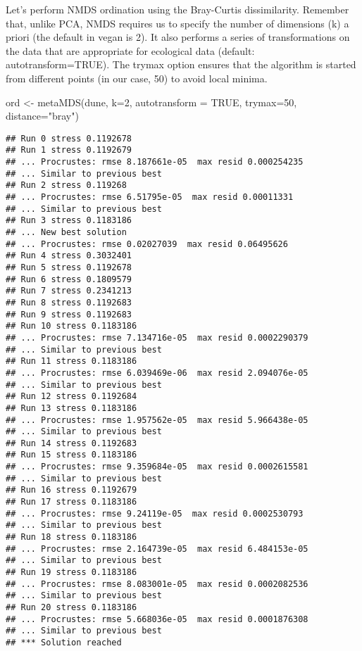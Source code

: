 \documentclass[
]{book}
\newenvironment{Shaded}{\begin{snugshade}}{\end{snugshade}}
\newcommand{\AttributeTok}[1]{\textcolor[rgb]{0.77,0.63,0.00}{#1}}
\newcommand{\ConstantTok}[1]{\textcolor[rgb]{0.00,0.00,0.00}{#1}}
\newcommand{\DecValTok}[1]{\textcolor[rgb]{0.00,0.00,0.81}{#1}}
\newcommand{\FunctionTok}[1]{\textcolor[rgb]{0.00,0.00,0.00}{#1}}
\newcommand{\NormalTok}[1]{#1}
\newcommand{\OtherTok}[1]{\textcolor[rgb]{0.56,0.35,0.01}{#1}}
\newcommand{\StringTok}[1]{\textcolor[rgb]{0.31,0.60,0.02}{#1}}
\begin{document}
Let's perform NMDS ordination using the Bray-Curtis dissimilarity. Remember that, unlike PCA, NMDS requires us to specify the number of dimensions (k) a priori (the default in vegan is 2). It also performs a series of transformations on the data that are appropriate for ecological data (default: autotransform=TRUE). The trymax option ensures that the algorithm is started from different points (in our case, 50) to avoid local minima.

\begin{Shaded}
\begin{Highlighting}[]
\NormalTok{ord }\OtherTok{\textless{}{-}} \FunctionTok{metaMDS}\NormalTok{(dune, }\AttributeTok{k=}\DecValTok{2}\NormalTok{, }\AttributeTok{autotransform =} \ConstantTok{TRUE}\NormalTok{, }\AttributeTok{trymax=}\DecValTok{50}\NormalTok{, }\AttributeTok{distance=}\StringTok{"bray"}\NormalTok{)}
\end{Highlighting}
\end{Shaded}

\begin{verbatim}
## Run 0 stress 0.1192678 
## Run 1 stress 0.1192679 
## ... Procrustes: rmse 8.187661e-05  max resid 0.000254235 
## ... Similar to previous best
## Run 2 stress 0.119268 
## ... Procrustes: rmse 6.51795e-05  max resid 0.00011331 
## ... Similar to previous best
## Run 3 stress 0.1183186 
## ... New best solution
## ... Procrustes: rmse 0.02027039  max resid 0.06495626 
## Run 4 stress 0.3032401 
## Run 5 stress 0.1192678 
## Run 6 stress 0.1809579 
## Run 7 stress 0.2341213 
## Run 8 stress 0.1192683 
## Run 9 stress 0.1192683 
## Run 10 stress 0.1183186 
## ... Procrustes: rmse 7.134716e-05  max resid 0.0002290379 
## ... Similar to previous best
## Run 11 stress 0.1183186 
## ... Procrustes: rmse 6.039469e-06  max resid 2.094076e-05 
## ... Similar to previous best
## Run 12 stress 0.1192684 
## Run 13 stress 0.1183186 
## ... Procrustes: rmse 1.957562e-05  max resid 5.966438e-05 
## ... Similar to previous best
## Run 14 stress 0.1192683 
## Run 15 stress 0.1183186 
## ... Procrustes: rmse 9.359684e-05  max resid 0.0002615581 
## ... Similar to previous best
## Run 16 stress 0.1192679 
## Run 17 stress 0.1183186 
## ... Procrustes: rmse 9.24119e-05  max resid 0.0002530793 
## ... Similar to previous best
## Run 18 stress 0.1183186 
## ... Procrustes: rmse 2.164739e-05  max resid 6.484153e-05 
## ... Similar to previous best
## Run 19 stress 0.1183186 
## ... Procrustes: rmse 8.083001e-05  max resid 0.0002082536 
## ... Similar to previous best
## Run 20 stress 0.1183186 
## ... Procrustes: rmse 5.668036e-05  max resid 0.0001876308 
## ... Similar to previous best
## *** Solution reached
\end{verbatim}
\end{document}
